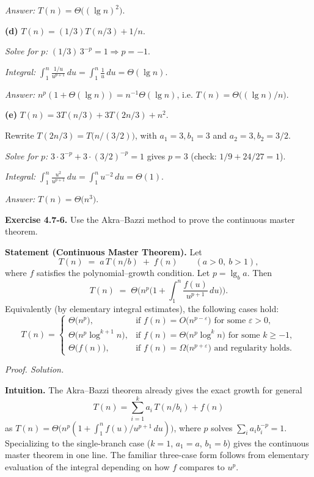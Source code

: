 \documentclass[12pt]{article}
\theoremstyle{definition}
\begin{document}
\emph{Answer:} $\boxed{T(n)=\Theta\big((\lg n)^{2}\big)}$.

\bigskip
\noindent\textbf{(d)} $T(n)=(1/3)T(n/3)+1/n$.

\emph{Solve for $p$:} $(1/3)\,3^{-p}=1 \Rightarrow p=-1$.

\emph{Integral:} $\displaystyle \int_{1}^{n}\frac{1/u}{u^{p+1}}\,du
=\int_{1}^{n}\frac{1}{u}\,du=\Theta(\lg n)$.

\emph{Answer:} $n^{p}(1+\Theta(\lg n))=n^{-1}\Theta(\lg n)$, i.e. $\boxed{T(n)=\Theta\big((\lg n)/n\big)}$.

\bigskip
\noindent\textbf{(e)} $T(n)=3T(n/3)+3T(2n/3)+n^{2}$.

Rewrite $T(2n/3)=T\!\big(n/(3/2)\big)$, with $a_1=3,b_1=3$ and $a_2=3,b_2=3/2$.

\emph{Solve for $p$:} $3\cdot 3^{-p}+3\cdot (3/2)^{-p}=1$ gives $p=3$ (check: $1/9+24/27=1$).

\emph{Integral:} $\displaystyle \int_{1}^{n}\frac{u^{2}}{u^{p+1}}\,du=\int_{1}^{n}u^{-2}\,du=\Theta(1)$.

\emph{Answer:} $\boxed{T(n)=\Theta\big(n^{3}\big)}$.

\newpage


\noindent\textbf{Exercise 4.7-6.}
Use the Akra–Bazzi method to prove the continuous master theorem.

\medskip
\noindent\textbf{Statement (Continuous Master Theorem).}
Let
\[
T(n)\;=\;a\,T(n/b)\;+\;f(n)\qquad(a>0,\ b>1),
\]
where $f$ satisfies the polynomial–growth condition.  Let $p=\lg_b a$.
Then
\[
\boxed{\quad T(n)\;=\;\Theta\!\Big(n^{p}\Big(1+\int_{1}^{n}\frac{f(u)}{u^{p+1}}\,du\Big)\Big). \quad}
\tag{CMT}
\]
Equivalently (by elementary integral estimates), the following cases hold:
\[
T(n)=
\begin{cases}
\Theta\!\big(n^{p}\big), & \text{if } f(n)=O\!\big(n^{p-\varepsilon}\big)\text{ for some }\varepsilon>0,\\[2mm]
\Theta\!\big(n^{p}\log^{k+1} n\big), & \text{if } f(n)=\Theta\!\big(n^{p}\log^{k}n\big)\text{ for some }k\ge -1,\\[2mm]
\Theta\!\big(f(n)\big), & \text{if } f(n)=\Omega\!\big(n^{p+\varepsilon}\big)\text{ and regularity holds.}
\end{cases}
\]

\medskip
\noindent\textit{Proof. Solution.}

\noindent\textbf{Intuition.}
The Akra–Bazzi theorem already gives the exact growth for general
\[
T(n)=\sum_{i=1}^{k}a_i\,T(n/b_i)+f(n)
\]
as $T(n)=\Theta\!\big(n^{p}(1+\int_1^n f(u)/u^{p+1}\,du)\big)$, where $p$ solves
$\sum_i a_i b_i^{-p}=1$.  Specializing to the single-branch case ($k=1$, $a_1=a$, $b_1=b$)
gives the continuous master theorem in one line.  The familiar three-case form follows
from elementary evaluation of the integral depending on how $f$ compares to $u^{p}$.
\end{document}
